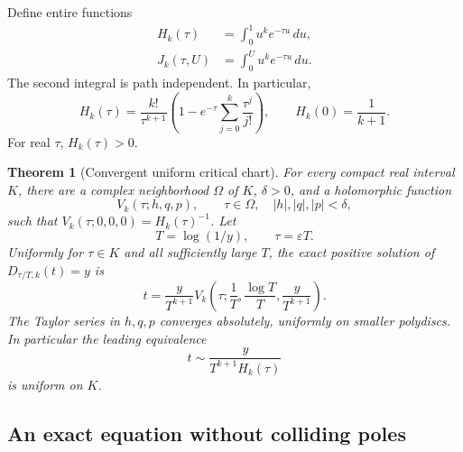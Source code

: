 \documentclass[11pt,a4paper]{article}
\numberwithin{equation}{section}
\newtheorem{theorem}{Theorem}[section]
\theoremstyle{definition}
\theoremstyle{remark}
\newcommand{\dd}{\,d}
\newcommand{\eps}{\varepsilon}
\begin{document}
Define entire functions
\begin{align}
 H_k(\tau)&=\int_0^1u^k e^{-\tau u}\dd u,
 \label{eq:Hk}\\
 J_k(\tau,U)&=\int_0^Uu^k e^{-\tau u}\dd u.
 \label{eq:Jk}
\end{align}
The second integral is path independent.  In particular,
\begin{equation}
 H_k(\tau)=\frac{k!}{\tau^{k+1}}
 \left(1-e^{-\tau}\sum_{j=0}^k\frac{\tau^j}{j!}\right),
 \qquad H_k(0)=\frac1{k+1}.
 \label{eq:Hkclosed}
\end{equation}
For real \(\tau\), \(H_k(\tau)>0\).

\begin{theorem}[Convergent uniform critical chart]
\label{thm:critical}
For every compact real interval \(K\), there are a complex neighborhood
\(\Omega\) of \(K\), \(\delta>0\), and a holomorphic function
\[
 V_k(\tau;h,q,p),\qquad
 \tau\in\Omega,\quad |h|,|q|,|p|<\delta,
\]
such that \(V_k(\tau;0,0,0)=H_k(\tau)^{-1}\).
Let
\[
 T=\log(1/y),\qquad \tau=\eps T.
\]
Uniformly for \(\tau\in K\) and all sufficiently large \(T\), the exact
positive solution of \(D_{\tau/T,k}(t)=y\) is
\begin{equation}
 \boxed{\quad
 t=\frac{y}{T^{k+1}}
 V_k\left(\tau;\frac1T,\frac{\log T}{T},
                    \frac{y}{T^{k+1}}\right).\quad}
 \label{eq:critical-chart}
\end{equation}
The Taylor series in \(h,q,p\) converges absolutely, uniformly on smaller
polydiscs.  In particular the leading equivalence
\begin{equation}
 t\sim\frac{y}{T^{k+1}H_k(\tau)}
 \label{eq:critical-leading}
\end{equation}
is uniform on \(K\).
\end{theorem}

\subsection{An exact equation without colliding poles}
\end{document}
